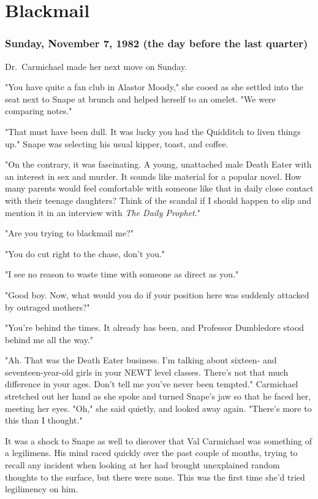 
\chapter{Blackmail}

\subsection{Sunday, November 7, 1982 (the day before the last quarter)}

Dr.~Carmichael made her next move on Sunday.

"You have quite a fan club in Alastor Moody," she cooed as she settled into the seat next to Snape at brunch and helped herself to an omelet. "We were comparing notes."

"That must have been dull. It was lucky you had the Quidditch to liven things up." Snape was selecting his usual kipper, toast, and coffee.

"On the contrary, it was fascinating. A young, unattached male Death Eater with an interest in sex and murder. It sounds like material for a popular novel. How many parents would feel comfortable with someone like that in daily close contact with their teenage daughters? Think of the scandal if I should happen to slip and mention it in an interview with \emph{The Daily Prophet}."

"Are you trying to blackmail me?"

"You do cut right to the chase, don't you."

"I see no reason to waste time with someone as direct as you."

"Good boy. Now, what would you do if your position here was suddenly attacked by outraged mothers?"

"You're behind the times. It already has been, and Professor Dumbledore stood behind me all the way."

"Ah. That was the Death Eater business. I'm talking about sixteen- and seventeen-year-old girls in your NEWT level classes. There's not that much difference in your ages. Don't tell me you've never been tempted." Carmichael stretched out her hand as she spoke and turned Snape's jaw so that he faced her, meeting her eyes. "Oh," she said quietly, and looked away again. "There's more to this than I thought."

It was a shock to Snape as well to discover that Val Carmichael was something of a legilimens. His mind raced quickly over the past couple of months, trying to recall any incident when looking at her had brought unexplained random thoughts to the surface, but there were none. This was the first time she'd tried legilimency on him.

